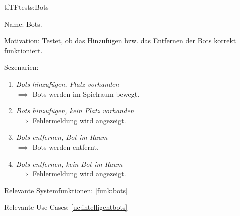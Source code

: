 \begin{description}[leftmargin=5em, style=sameline]

\begin{lhp}{tf}{TF}{tests:Bots }
	\item [Name:] Bots.
	\item [Motivation:] Testet, ob das Hinzufügen bzw. das Entfernen der Bots korrekt funktioniert.
	\item [Sczenarien:] \hfill
		\begin{enumerate}
			\item \textit{Bots hinzufügen, Platz vorhanden} \\ $\implies$ Bots werden im Spielraum bewegt.
			\item \textit{Bots hinzufügen, kein Platz vorhanden} \\ $\implies$ Fehlermeldung wird angezeigt.
			\item \textit{Bots entfernen, Bot im Raum} \\ $\implies$ Bots werden entfernt.
			\item \textit{Bots entfernen, kein Bot im Raum} \\ $\implies$ Fehlermeldung wird angezeigt.
		\end{enumerate}
	\item [Relevante Systemfunktionen:] \ref{funk:bots}
	\item [Relevante Use Cases:] \ref{uc:intelligentbots}
\end{lhp}

\end{description}

